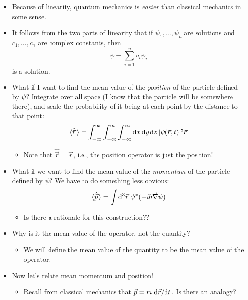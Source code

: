 \documentclass[../notes.tex]{subfiles}
\begin{document}
\begin{itemize}
    \item Because of linearity, quantum mechanics is \emph{easier} than classical mechanics in some sense.
    \item It follows from the two parts of linearity that if $\psi_1,\dots,\psi_n$ are solutions and $c_1,\dots,c_n$ are complex constants, then
    \begin{equation*}
        \psi = \sum_{i=1}^nc_i\psi_i
    \end{equation*}
    is a solution.
    \item What if I want to find the mean value of the \emph{position} of the particle defined by $\psi$? Integrate over all space (I know that the particle will be somewhere there), and scale the probability of it being at each point by the distance to that point:
    \begin{equation*}
        \langle{\hat{\vec{r}}\,}\rangle = \int_{-\infty}^\infty\int_{-\infty}^\infty\int_{-\infty}^\infty\dd{x}\dd{y}\dd{z}|\psi(\vec{r},t)|^2\vec{r}
    \end{equation*}
    \begin{itemize}
        \item Note that $\hat{\vec{r}}=\vec{r}$, i.e., the position operator is just the position!
    \end{itemize}
    \item What if we want to find the mean value of the \emph{momentum} of the particle defined by $\psi$? We have to do something less obvious:
    \begin{equation*}
        \Exp{\hat{\vec{p}}\,} = \int\dd^3\vec{r}\ \psi^*(-i\hbar\vec{\nabla}\psi)
    \end{equation*}
    \begin{itemize}
        \item Is there a rationale for this construction??
    \end{itemize}
    \item Why is it the mean value of the operator, not the quantity?
    \begin{itemize}
        \item We will define the mean value of the quantity to be the mean value of the operator.
    \end{itemize}
    \item Now let's relate mean momentum and position!
    \begin{itemize}
        \item Recall from classical mechanics that $\vec{p}=m\dv*{\vec{r}}{t}$. Is there an analogy?

\end{itemize}
\end{itemize}
\end{document}
